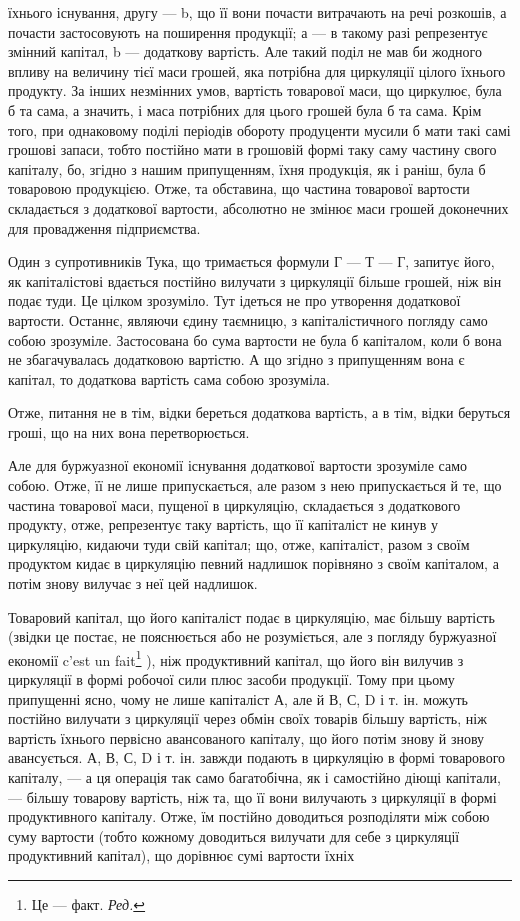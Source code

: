 \parcont{}  %
їхнього існування, другу — b, що її вони почасти витрачають на речі
розкошів, а почасти застосовують на поширення продукції; а — в такому
разі репрезентує змінний капітал, b — додаткову вартість. Але такий поділ
не мав би жодного впливу на величину тієї маси грошей, яка потрібна
для циркуляції цілого їхнього продукту. За інших незмінних умов, вартість
товарової маси, що циркулює, була б та сама, а значить, і маса
потрібних для цього грошей була б та сама. Крім того, при однаковому
поділі періодів обороту продуценти мусили б мати такі самі грошові запаси,
тобто постійно мати в грошовій формі таку саму частину свого
капіталу, бо, згідно з нашим припущенням, їхня продукція, як і раніш,
була б товаровою продукцією. Отже, та обставина, що частина товарової
вартости складається з додаткової вартости, абсолютно не змінює маси
грошей доконечних для провадження підприємства.

Один з супротивників Тука, що тримається формули Г — Т — Г, запитує
його, як капіталістові вдається постійно вилучати з циркуляції більше
грошей, ніж він подає туди. Це цілком зрозуміло. Тут ідеться не про
утворення додаткової вартости. Останнє, являючи єдину таємницю, з
капіталістичного погляду само собою зрозуміле. Застосована бо сума вартости
не була б капіталом, коли б вона не збагачувалась додатковою
вартістю. А що згідно з припущенням вона є капітал, то додаткова вартість
сама собою зрозуміла.

Отже, питання не в тім, відки береться додаткова вартість, а в тім,
відки беруться гроші, що на них вона перетворюється.

Але для буржуазної економії існування додаткової вартости зрозуміле
само собою. Отже, її не лише припускається, але разом з нею припускається
й те, що частина товарової маси, пущеної в циркуляцію, складається
з додаткового продукту, отже, репрезентує таку вартість, що її капіталіст
не кинув у циркуляцію, кидаючи туди свій капітал; що, отже, капіталіст,
разом з своїм продуктом кидає в циркуляцію певний надлишок
порівняно з своїм капіталом, а потім знову вилучає з неї цей надлишок.

Товаровий капітал, що його капіталіст подає в циркуляцію, має більшу
вартість (звідки це постає, не пояснюється або не розуміється, але з
погляду буржуазної економії c’est un fait\footnote*{
Це — факт. \emph{Ред.}
} ), ніж продуктивний капітал,
що його він вилучив з циркуляції в формі робочої сили плюс засоби
продукції. Тому при цьому припущенні ясно, чому не лише капіталіст
А, але й В, С, D і т. ін. можуть постійно вилучати з циркуляції через
обмін своїх товарів більшу вартість, ніж вартість їхнього первісно авансованого
капіталу, що його потім знову й знову авансується. А, В, С,
D і т. ін. завжди подають в циркуляцію в формі товарового капіталу, —
а ця операція так само багатобічна, як і самостійно діющі капітали, —
більшу товарову вартість, ніж та, що її вони вилучають з циркуляції в
формі продуктивного капіталу. Отже, їм постійно доводиться розподіляти
між собою суму вартости (тобто кожному доводиться вилучати для себе
з циркуляції продуктивний капітал), що дорівнює сумі вартости їхніх
\parbreak{}  %
